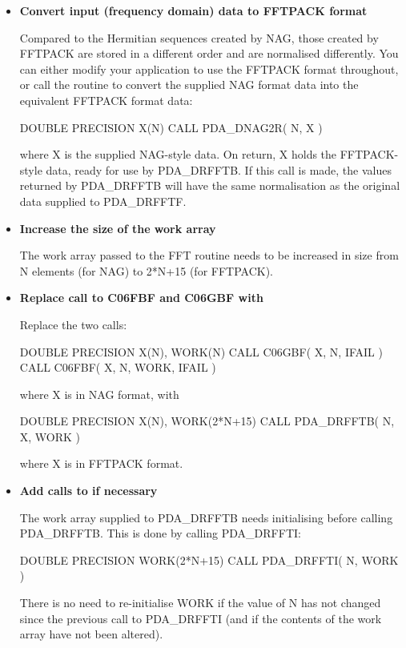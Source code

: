 \documentclass[11pt,twoside,nolof]{starlink}
\begin{document}
\begin{itemize}

\item\textbf{Convert input (frequency domain) data to FFTPACK format}

   Compared to the Hermitian sequences created by NAG, those created by
   FFTPACK are stored in a different order and are normalised
   differently. You can either modify your application to use the
   FFTPACK format throughout, or call the
   routine to convert the supplied NAG format data into the
   equivalent FFTPACK format data:

\begin{terminalv}
      DOUBLE PRECISION X(N)
      CALL PDA_DNAG2R( N, X )
\end{terminalv}

   where X is the supplied NAG-style data. On return, X holds the
   FFTPACK-style data, ready for use by PDA\_DRFFTB. If this call is made,
   the values returned by PDA\_DRFFTB will have the same normalisation as the
   original data supplied to PDA\_DRFFTF.

\item\textbf{Increase the size of the work array}

   The work array passed to the FFT routine needs to be increased in
   size from N elements (for NAG) to 2*N+15 (for FFTPACK).

\item\textbf{Replace call to C06FBF and C06GBF with
}

   Replace the two calls:

\begin{terminalv}
      DOUBLE PRECISION X(N), WORK(N)
      CALL C06GBF( X, N, IFAIL )
      CALL C06FBF( X, N, WORK, IFAIL )
\end{terminalv}

   where X is in NAG format, with

\begin{terminalv}
      DOUBLE PRECISION X(N), WORK(2*N+15)
      CALL PDA_DRFFTB( N, X, WORK )
\end{terminalv}

   where X is in FFTPACK format.

\item\textbf{Add calls to
   if necessary}

   The work array supplied to PDA\_DRFFTB needs initialising before calling
   PDA\_DRFFTB. This is done by calling PDA\_DRFFTI:

\begin{terminalv}
      DOUBLE PRECISION WORK(2*N+15)
      CALL PDA_DRFFTI( N, WORK )
\end{terminalv}

   There is no need to re-initialise WORK if the value of N has not
   changed since the previous call to PDA\_DRFFTI (and if the contents of the
   work array have not been altered).

\end{itemize}
\end{document}
